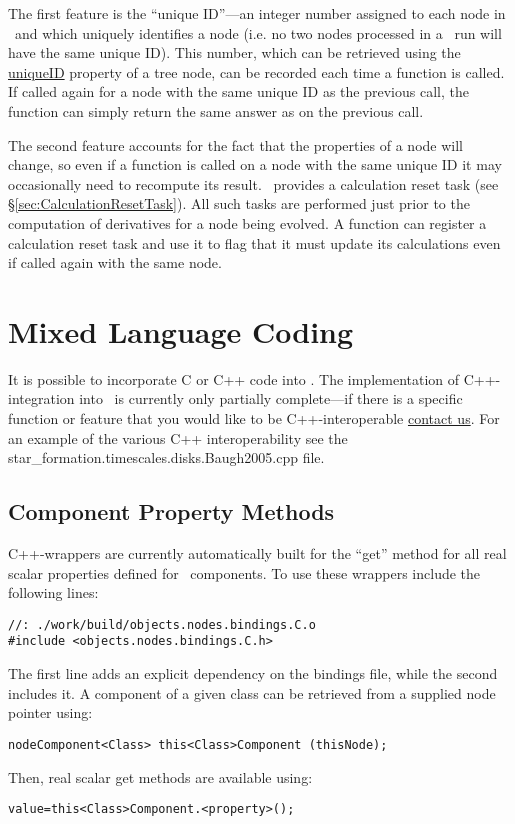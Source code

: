 The first feature is the ``unique ID''---an integer number assigned to each node in \glc\ and which uniquely identifies a node (i.e. no two nodes processed in a \glc\ run will have the same unique ID). This number, which can be retrieved using the \href{method:uniqueID}{{\normalfont \ttfamily uniqueID}} property of a tree node, can be recorded each time a function is called. If called again for a node with the same unique ID as the previous call, the function can simply return the same answer as on the previous call.

The second feature accounts for the fact that the properties of a node will change, so even if a function is called on a node with the same unique ID it may occasionally need to recompute its result. \glc\ provides a calculation reset task (see \S\ref{sec:CalculationResetTask}). All such tasks are performed just prior to the computation of derivatives for a node being evolved. A function can register a calculation reset task and use it to flag that it must update its calculations even if called again with the same node.

\section{Mixed Language Coding}\label{sec:MixedLanguageCoding}

It is possible to incorporate C or C++ code into \glc. The implementation of C++-integration into \glc\ is currently only partially complete---if there is a specific function or feature that you would like to be C++-interoperable \href{mailto:abenson@carnegiescience.edu}{contact us}. For an example of the various C++ interoperability see the {\normalfont \ttfamily star\_formation.timescales.disks.Baugh2005.cpp} file.

\subsection{Component Property Methods}

C++-wrappers are currently automatically built for the ``get'' method for all real scalar properties defined for \glc\ components. To use these wrappers include the following lines:
\begin{verbatim}
//: ./work/build/objects.nodes.bindings.C.o
#include <objects.nodes.bindings.C.h>
\end{verbatim}
The first line adds an explicit dependency on the bindings file, while the second includes it. A component of a given class can be retrieved from a supplied node pointer using:
\begin{verbatim}
nodeComponent<Class> this<Class>Component (thisNode);
\end{verbatim}
Then, real scalar get methods are available using:
\begin{verbatim}
value=this<Class>Component.<property>();
\end{verbatim}

